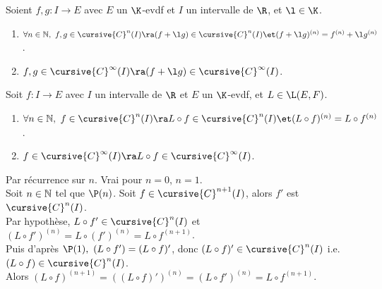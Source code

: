 \documentclass[11pt]{article}
\begin{document}
\begin{prop}{}{}
    Soient $f,g:I\to E$ avec $E$ un $\K$-evdf et $I$ un intervalle de $\R$, et $\l\in\K$.
    \begin{enumerate}
        \item $\forall n \in \N, ~ f,g\in\cursive{C}^n(I) \ra (f+\l g) \in \cursive{C}^n(I) \et (f+\l g)^{(n)}=f^{(n)}+\l g^{(n)}$.
        \item $f,g \in \cursive{C}^{\infty}(I) \ra (f+\l g)\in\cursive{C}^{\infty}(I)$.
    \end{enumerate}
\end{prop}

\vspace*{-0.7cm}

\begin{prop}{}{}
    Soit $f:I\to E$ avec $I$ un intervalle de $\R$ et $E$ un $\K$-evdf, et $L\in\L(E,F)$.
    \begin{enumerate}
        \item $\forall n \in \N,~f\in\cursive{C}^n(I)\ra L\circ f\in\cursive{C}^n(I) \et (L\circ f)^{(n)}=L\circ f^{(n)}$.
        \item $f\in\cursive{C}^\infty(I) \ra L\circ f \in \cursive{C}^{\infty}(I)$.
    \end{enumerate}
    \tcblower 
    Par récurrence sur $n$. Vrai pour $n=0$, $n=1$.\\
    Soit $n\in\mathbb{N}$ tel que $\P(n)$. Soit $f\in\cursive{C}^{n+1}(I)$, alors $f'$ est $\cursive{C}^n(I)$.\\
    Par hypothèse, $L\circ f'\in\cursive{C}^n(I)$ et $(L\circ f')^{(n)}=L\circ (f')^{(n)}=L\circ f^{(n+1)}$.\\
    Puis d'après $\P(1), ~ (L\circ f')=(L\circ f)'$, donc $(L\circ f)'\in\cursive{C}^n(I)$ i.e. $(L\circ f)\in \cursive{C}^n(I)$.\\
    Alors $(L\circ f)^{(n+1)}=((L\circ f)')^{(n)}=(L\circ f')^{(n)}=L\circ f^{(n+1)}$.
\end{prop}

\vspace*{-0.7cm}
\end{document}
